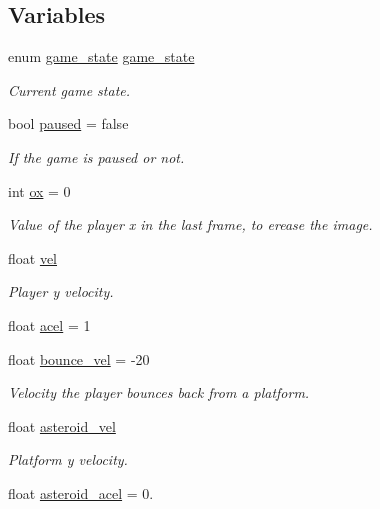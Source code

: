 \subsection*{Variables}
\begin{DoxyCompactItemize}
\item 
enum \hyperlink{group__utils_gad0ed1832dd134806ad335cdcc1a59ad2}{game\+\_\+state} \hyperlink{group__Game_ga38caf7c28534bcd60ff95faf7fcae2d7}{game\+\_\+state}
\begin{DoxyCompactList}\small\item\em Current game state. \end{DoxyCompactList}\item 
bool \hyperlink{group__Game_ga1656129c4a4fd8809254194f08f0ac70}{paused} = false
\begin{DoxyCompactList}\small\item\em If the game is paused or not. \end{DoxyCompactList}\item 
int \hyperlink{group__Game_gafef635ed3c73fc60d8faf6dd610c4298}{ox} = 0
\begin{DoxyCompactList}\small\item\em Value of the player x in the last frame, to erease the image. \end{DoxyCompactList}\item 
float \hyperlink{group__Game_gafc29fb7fadd39a1bc2e3c52532248689}{vel}
\begin{DoxyCompactList}\small\item\em Player y velocity. \end{DoxyCompactList}\item 
float \hyperlink{group__Game_gab3a9c86761412cb0f30bbd761491e683}{acel} = 1
\item 
float \hyperlink{group__Game_ga223eb1bebc2dce2b95cb54c56c82b040}{bounce\+\_\+vel} = -\/20
\begin{DoxyCompactList}\small\item\em Velocity the player bounces back from a platform. \end{DoxyCompactList}\item 
float \hyperlink{group__Game_gaae54be6a12a3487f02901b15ab46a37b}{asteroid\+\_\+vel}
\begin{DoxyCompactList}\small\item\em Platform y velocity. \end{DoxyCompactList}\item 
float \hyperlink{group__Game_ga5b34aa944fc2c29ad1b5e7ca7fb44449}{asteroid\+\_\+acel} = 0.

\end{DoxyCompactItemize}
